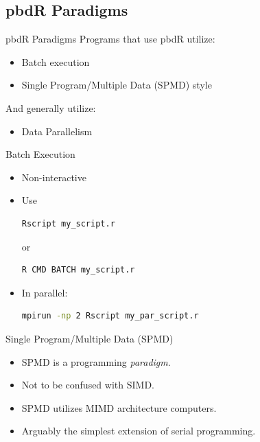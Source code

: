 \subsection{pbdR Paradigms}

\begin{frame}
  \begin{block}{pbdR Paradigms}
  Programs that use pbdR utilize:
  \begin{itemize}[<+-|alert@+>]
   \item Batch execution
   \item Single Program/Multiple Data (SPMD) style
   \\[.2cm]
   \end{itemize}
    And generally utilize:
   \begin{itemize}
   \item Data Parallelism
  \end{itemize}
  \end{block}
\end{frame}


\begin{frame}[fragile]
  \begin{block}{Batch Execution}\pause
    \begin{itemize}
      \item Non-interactive
      \item Use
\vspace{-.4cm}
\begin{lstlisting}[language=sh]
Rscript my_script.r
\end{lstlisting}
or\vspace{-.4cm}
\begin{lstlisting}[language=sh]
R CMD BATCH my_script.r
\end{lstlisting}
      \item In parallel:
\vspace{-.4cm}
\begin{lstlisting}[language=sh]
mpirun -np 2 Rscript my_par_script.r
\end{lstlisting}
    \end{itemize}
  \end{block}
\end{frame}


\begin{frame}
  \begin{block}{Single Program/Multiple Data (SPMD)}\pause
    \begin{itemize}
      \item SPMD is a programming \emph{paradigm}.
      \item Not to be confused with SIMD.
      \item SPMD utilizes MIMD architecture computers.
      \item Arguably the simplest extension of serial programming.
    \end{itemize}
  \end{block}
\end{frame}


